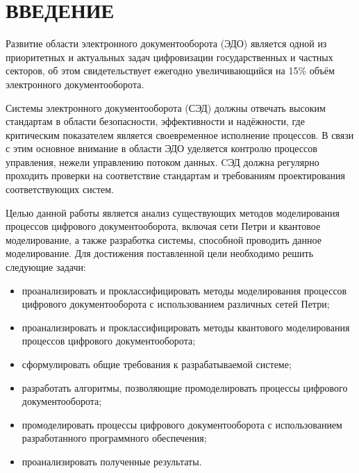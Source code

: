 \section*{ВВЕДЕНИЕ}

Развитие области электронного документооборота (ЭДО) является одной из приоритетных и актуальных задач цифровизации государственных и частных секторов, об этом свидетельствует ежегодно увеличивающийся на 15\% объём электронного документооборота\cite{dadaya}. 

Системы электронного документооборота (СЭД) должны отвечать высоким стандартам в области безопасности, эффективности и надёжности, где критическим показателем является своевременное исполнение процессов\cite{dadaya}. В связи с этим основное внимание в области ЭДО уделяется контролю процессов управления, нежели управлению потоком данных\cite{dadaya}. CЭД должна регулярно проходить проверки на соответствие стандартам и требованиям проектирования соответствующих систем\cite{dadaya}. 

Целью данной работы является анализ существующих методов моделирования процессов цифрового документооборота, включая сети Петри и квантовое моделирование, а также разработка системы, способной проводить данное моделирование. Для достижения поставленной цели необходимо решить следующие задачи:
\begin{itemize}
	\item проанализировать и проклассифицировать методы моделирования процессов цифрового документооборота с использованием различных сетей Петри;
	\item проанализировать и проклассифицировать методы квантового моделирования процессов цифрового документооборота;
	\item сформулировать общие требования к разрабатываемой системе;
	\item разработать алгоритмы, позволяющие промоделировать процессы цифрового документооборота;
	\item промоделировать процессы цифрового документооборота с использованием разработанного программного обеспечения;
	\item проанализировать полученные результаты.
\end{itemize}

\pagebreak
